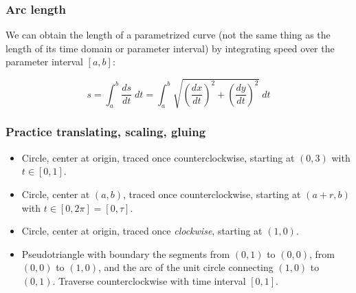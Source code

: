 \documentclass[11pt,ignorenonframetext,aspectratio=169,xcolor={svgnames}]{beamer}
\begin{document}
\begin{frame}\frametitle{Arc length}

We can obtain the length of a parametrized curve (not the same thing as
the length of its time domain or parameter interval) by integrating
speed over the parameter interval $[a,b]$:

\begin{equation*}
    s = \int_a^b \frac{ds}{dt} \; dt = \int_a^b \sqrt{\left( \frac{dx}{dt} \right)^2 + \left( \frac{dy}{dt} \right)^2} \; dt
\end{equation*}

\end{frame}

\begin{frame}\frametitle{Practice translating, scaling, gluing}

\begin{itemize}
\itemsep1pt\parskip0pt
\item
  Circle, center at origin, traced once counterclockwise, starting at
  $(0,3)$ with $t \in [0,1]$.
\item
  Circle, center at $(a,b)$, traced once counterclockwise, starting at
  $(a+r, b)$ with $t \in [0, 2\pi] = [0, \tau]$.
\item
  Circle, center at origin, traced once \emph{clockwise}, starting at
  $(1,0)$.
\item
  Pseudotriangle with boundary the segments from $(0,1)$ to $(0,0)$,
  from $(0,0)$ to $(1,0)$, and the arc of the unit circle connecting
  $(1,0)$ to $(0,1)$. Traverse counterclockwise with time interval
  $[0,1]$.
\end{itemize}

\end{frame}
\end{document}
